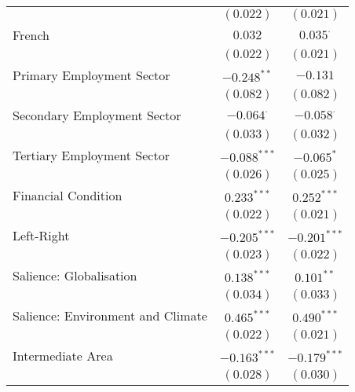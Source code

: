 \begin{center}
\begin{tiny}
\begin{longtable}{l@{} c@{} c@{}}
                                                         & $(0.022)$        & $(0.021)$        \\
\quad French                                             & $0.032$          & $0.035^{\cdot}$  \\
                                                         & $(0.022)$        & $(0.021)$        \\
\quad Primary Employment Sector                          & $-0.248^{**}$    & $-0.131$         \\
                                                         & $(0.082)$        & $(0.082)$        \\
\quad Secondary Employment Sector                        & $-0.064^{\cdot}$ & $-0.058^{\cdot}$ \\
                                                         & $(0.033)$        & $(0.032)$        \\
\quad Tertiary Employment Sector                         & $-0.088^{***}$   & $-0.065^{*}$     \\
                                                         & $(0.026)$        & $(0.025)$        \\
\quad Financial Condition                                & $0.233^{***}$    & $0.252^{***}$    \\
                                                         & $(0.022)$        & $(0.021)$        \\
\quad Left-Right                                         & $-0.205^{***}$   & $-0.201^{***}$   \\
                                                         & $(0.023)$        & $(0.022)$        \\
\quad Salience: Globalisation                            & $0.138^{***}$    & $0.101^{**}$     \\
                                                         & $(0.034)$        & $(0.033)$        \\
\quad Salience: Environment and Climate                  & $0.465^{***}$    & $0.490^{***}$    \\
                                                         & $(0.022)$        & $(0.021)$        \\
\quad Intermediate Area                                  & $-0.163^{***}$   & $-0.179^{***}$   \\
                                                         & $(0.028)$        & $(0.030)$        \\

\end{longtable}
\end{tiny}
\end{center}
